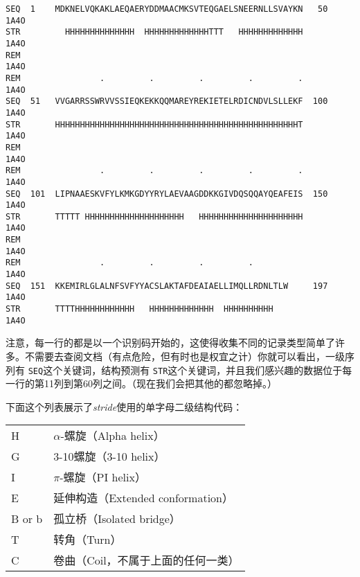 \begin{lstlisting}
SEQ  1    MDKNELVQKAKLAEQAERYDDMAACMKSVTEQGAELSNEERNLLSVAYKN   50          1A4O
STR         HHHHHHHHHHHHHH  HHHHHHHHHHHHHTTT   HHHHHHHHHHHHH               1A4O
REM                                                                        1A4O
REM                .         .         .         .         .               1A4O
SEQ  51   VVGARRSSWRVVSSIEQKEKKQQMAREYREKIETELRDICNDVLSLLEKF  100          1A4O
STR       HHHHHHHHHHHHHHHHHHHHHHHHHHHHHHHHHHHHHHHHHHHHHHHHHT               1A4O
REM                                                                        1A4O
REM                .         .         .         .         .               1A4O
SEQ  101  LIPNAAESKVFYLKMKGDYYRYLAEVAAGDDKKGIVDQSQQAYQEAFEIS  150          1A4O
STR       TTTTT HHHHHHHHHHHHHHHHHHHH   HHHHHHHHHHHHHHHHHHHHH               1A4O
REM                                                                        1A4O
REM                .         .         .         .                         1A4O
SEQ  151  KKEMIRLGLALNFSVFYYACSLAKTAFDEAIAELLIMQLLRDNLTLW     197          1A4O
STR       TTTTHHHHHHHHHHHH   HHHHHHHHHHHHH  HHHHHHHHHH                     1A4O
\end{lstlisting}

注意，每一行的都是以一个识别码开始的，这使得收集不同的记录类型简单了许多。不需要去查阅文档（有点危险，但有时也是权宜之计）你就可以看出，一级序列有 \verb|SEQ|这个关键词，结构预测有 \verb|STR|这个关键词，并且我们感兴趣的数据位于每一行的第11列到第60列之间。（现在我们会把其他的都忽略掉。）

下面这个列表展示了\textit{stride}使用的单字母二级结构代码：

\begin{table}[!htbp]
  \begin{center}
  \begin{tabu} to 0.5\linewidth {X[1,l,m]X[2,l,m]}
  \toprule
  H & $\alpha$-螺旋（Alpha helix）\\
  G & 3-10螺旋（3-10 helix）\\
  I & $\pi$-螺旋（PI helix）\\
  E & 延伸构造（Extended conformation）\\
  B or b& 孤立桥（Isolated bridge）\\
  T & 转角（Turn）\\
  C & 卷曲（Coil，不属于上面的任何一类）\\
  \bottomrule
  \end{tabu}
  \end{center}
\end{table}

